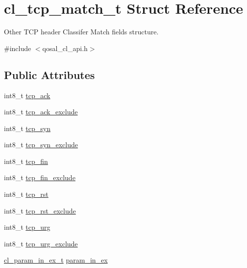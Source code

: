\hypertarget{structcl__tcp__match__t}{\section{cl\-\_\-tcp\-\_\-match\-\_\-t Struct Reference}
\label{structcl__tcp__match__t}
}


Other T\-C\-P header Classifer Match fields structure.  




{\ttfamily \#include $<$qosal\-\_\-cl\-\_\-api.\-h$>$}

\subsection*{Public Attributes}
\begin{DoxyCompactItemize}
\item 
int8\-\_\-t \hyperlink{structcl__tcp__match__t_a4c8d0d419dbc541bbb925b49d2a18af8}{tcp\-\_\-ack}
\item 
int8\-\_\-t \hyperlink{structcl__tcp__match__t_aef633562984ce156cc0377eccf39fd58}{tcp\-\_\-ack\-\_\-exclude}
\item 
int8\-\_\-t \hyperlink{structcl__tcp__match__t_a3054b277d565dff3f68fb560ee17b2c8}{tcp\-\_\-syn}
\item 
int8\-\_\-t \hyperlink{structcl__tcp__match__t_ae799dfae675d3c763eeead36f7215cf4}{tcp\-\_\-syn\-\_\-exclude}
\item 
int8\-\_\-t \hyperlink{structcl__tcp__match__t_ae1800016c2f4bb66c33b88cb972bbae5}{tcp\-\_\-fin}
\item 
int8\-\_\-t \hyperlink{structcl__tcp__match__t_a37d15354a737db5db242fc78d9bf8437}{tcp\-\_\-fin\-\_\-exclude}
\item 
int8\-\_\-t \hyperlink{structcl__tcp__match__t_ae970db5f46617f16e947d5109f46de8b}{tcp\-\_\-rst}
\item 
int8\-\_\-t \hyperlink{structcl__tcp__match__t_aa9138e76adc06cc449ab22ceb00606de}{tcp\-\_\-rst\-\_\-exclude}
\item 
int8\-\_\-t \hyperlink{structcl__tcp__match__t_a9c84cc54073afb4eafad6c8ff7ede7d4}{tcp\-\_\-urg}
\item 
int8\-\_\-t \hyperlink{structcl__tcp__match__t_aea720fc510ee2144778ae66e34f8e3be}{tcp\-\_\-urg\-\_\-exclude}
\item 
\hyperlink{structcl__param__in__ex__t}{cl\-\_\-param\-\_\-in\-\_\-ex\-\_\-t} \hyperlink{structcl__tcp__match__t_a56a6917691204e3902a9dee782faf4fc}{param\-\_\-in\-\_\-ex}
\end{DoxyCompactItemize}


